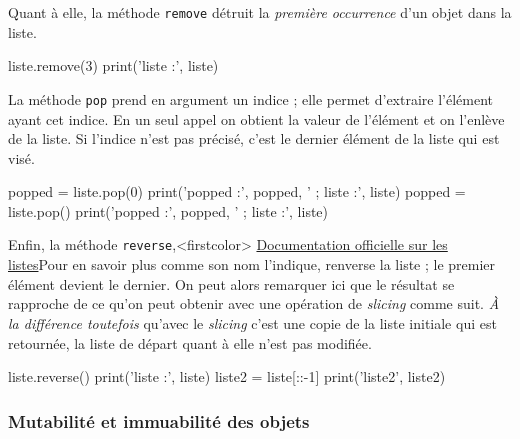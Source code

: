 \vspace{-1pt}

Quant à elle, la méthode \texttt{remove} détruit la \emph{première occurrence} d'un objet dans la liste.

\vspace{-1pt}

\begin{idleconsole}
\begin{pyconsole}
liste.remove(3)
print('liste :', liste)
\end{pyconsole}
\end{idleconsole}

\vspace{-1pt}

La méthode \texttt{pop} prend en argument un indice ; elle permet d'extraire l'élément ayant cet indice. En un seul appel on obtient la valeur de l'élément et on l'enlève de la liste. Si l'indice n'est pas précisé, c'est le dernier élément de la liste qui est visé.

\vspace{-1pt}

\begin{idleconsole}
\begin{pyconsole}
popped = liste.pop(0)
print('popped :', popped, ' ; liste :', liste)
popped = liste.pop()
print('popped :', popped, ' ; liste :', liste)
\end{pyconsole}
\end{idleconsole}

Enfin, la méthode \texttt{reverse},\caution[t]<firstcolor>{%
\href{https://docs.python.org/3/tutorial/datastructures.html\#more-on-lists}{Documentation officielle sur les listes}}{Pour en savoir plus}
 comme son nom l'indique, renverse la liste ; le premier élément devient le dernier. On peut alors remarquer ici que le résultat se rapproche de ce qu'on peut obtenir avec une opération de \textit{slicing} comme suit. \emph{À la différence toutefois} qu'avec le \textit{slicing} c'est une copie de la liste initiale qui est retournée, la liste de départ quant à elle n'est pas modifiée.

\begin{idleconsole}
\begin{pyconsole}
liste.reverse()
print('liste :', liste)
liste2 = liste[::-1]
print('liste2', liste2)
\end{pyconsole}
\end{idleconsole}

\subsubsection[Mutabilité et immuabilité des objets]{Mutabilité et immuabilité des objets}
\label{subsub:XI.2.2.3}

